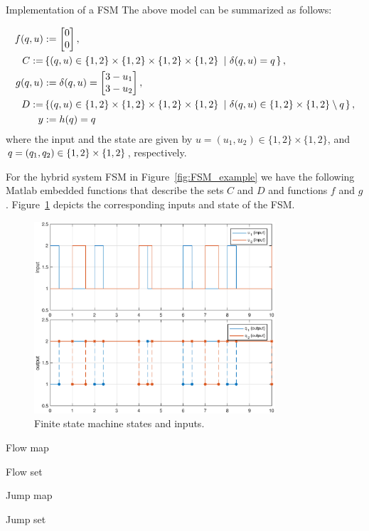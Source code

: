 \begin{example}{Implementation of a FSM}
The above model can be summarized as follows:

\begin{align}\label{eqn:CTdynamicsHcFSM}
f(\xlogic, u)&:= \begin{bmatrix}0\\0\end{bmatrix},\\ 
   C :=& \defset{(\xlogic,u)\in\{1,2\}\times\{1,2\}\times\{1,2\}\times\{1,2\}}{ \delta(\xlogic,u) =  \xlogic},\\
g(\xlogic, u)&:= \delta(\xlogic, u) = \begin{bmatrix}3-u_1\\3-u_2\end{bmatrix}, \\
    D :=& \defset{(\xlogic,u)\in\{1,2\}\times\{1,2\}\times\{1,2\}\times\{1,2\}}{ \delta(\xlogic,u) \in\{1,2\}\times\{1,2\}\setminus \xlogic},\\ 
y &:= h(\xlogic) =\xlogic
\end{align}
where the input and the state are given by $u = (u_1,u_2) \in\{1,2\}\times\{1,2\}$, and $q=(q_1,q_2)\in\{1,2\}\times\{1,2\}$, respectively.

For the hybrid system FSM in Figure~\ref{fig:FSM_example} we have the following Matlab embedded functions that describe the sets $C$ and $D$ and functions $f$ and $g$.
Figure~\ref{fig:FSMresults} depicts the corresponding inputs and state of the FSM.

\begin{figure}[ht]
  \begin{center}
    \includegraphics[width=0.8\textwidth]{figures/Simulink/FSMresults.eps}
   \caption{Finite state machine states and inputs.}
\label{fig:FSMresults}
  \end{center}
\end{figure}



Flow map
\label{scr:f}

Flow set
\label{scr:C}

Jump map
\label{scr:g}

Jump set
\label{scr:D}


\end{example}
